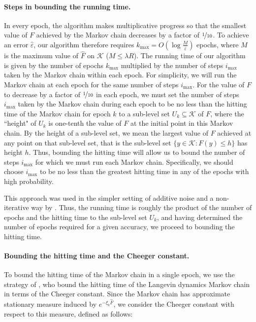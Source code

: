 \documentclass[final,12pt]{colt2018} %
\begin{document}
{\paragraph{Steps in bounding the running time.}
In every epoch, the algorithm makes multiplicative progress so that the smallest value of $F$ achieved by the Markov chain decreases by a factor of $\nicefrac{1}{10}$.  
%
To achieve an error $\hat{\varepsilon}$, our algorithm therefore requires $k_{\mathrm{max}} = O(\log \frac{M}{\hat{\varepsilon}})$ epochs, where $M$ is the maximum value of $\hat{F}$ on $\mathcal{K}$ ($M \leq \lambda R$).  
%
The running time of our algorithm is given by the number of epochs $k_{\mathrm{max}}$ multiplied by the number of steps $i_{\mathrm{max}}$ taken by the Markov chain within each epoch.  
%
For simplicity, we will run the Markov chain at each epoch for the same number of steps $i_{\mathrm{max}}$.
% 
For the value of $F$ to decrease by a factor of $\nicefrac{1}{10}$ in each epoch, we must set the number of steps $i_{\mathrm{max}}$ taken by the Markov chain during each epoch to be no less than the hitting time of the Markov chain for epoch $k$ to a sub-level set $U_k\subseteq \mathcal{K}$ of $F$, where the ``height" of $U_k$ is one-tenth the value of $F$ at the initial point in this Markov chain.  
%
By the height of a sub-level set, we mean the largest value of $F$ achieved at any point on that sub-level set, that is the sub-level set $\{y\in \mathcal{K}: F(y) \leq h\}$ has height $h$.  
%
Thus, bounding the hitting time will allow us to bound the number of steps $i_{\mathrm{max}}$ for which we must run each Markov chain.  Specifically, we should choose $i_{\mathrm{max}}$ to be no less than the greatest hitting time in any of the epochs with high probability. %

% 
 This approach was used in the simpler setting of additive noise and a non-iterative way by \cite{hitting_times}.  
 Thus, the running time is roughly the product of the number of epochs and the hitting time to the sub-level set $U_k$,
  and having determined the number of epochs required for a given accuracy, we proceed to bounding the hitting time.

\paragraph{Bounding the hitting time and the Cheeger constant.}


To bound the hitting time of the Markov chain in a single epoch, we use the strategy of \cite{hitting_times}, who bound the hitting time of the Langevin dynamics Markov chain in terms of the Cheeger constant.  
%
Since the Markov chain has approximate stationary measure induced by $e^{-\xi_k \hat{F}}$, we consider the Cheeger constant with respect to this measure, defined as follows:

}
\end{document}
